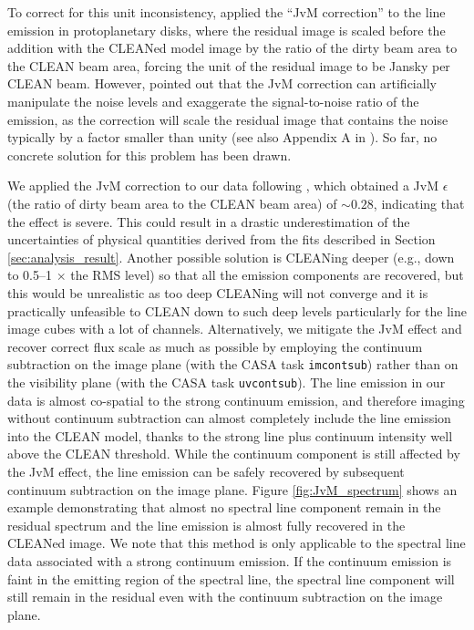 \documentclass[twocolumn, twocolappendix, astrosymb, times]{aastex631}
\begin{document}
To correct for this unit inconsistency, \citet{Czekala2021} applied the ``JvM correction'' to the line emission in protoplanetary disks, where the residual image is scaled before the addition with the CLEANed model image by the ratio of the dirty beam area to the CLEAN beam area, forcing the unit of the residual image to be Jansky per CLEAN beam. However, \citet{Casassus2022} pointed out that the JvM correction can artificially manipulate the noise levels and exaggerate the signal-to-noise ratio of the emission, as the correction will scale the residual image that contains the noise typically by a factor smaller than unity (see also Appendix A in \citealt{Casassus2023}). So far, no concrete solution for this problem has been drawn.

We applied the JvM correction to our data following \citet{Czekala2021}, which obtained a JvM $\epsilon$ (the ratio of dirty beam area to the CLEAN beam area) of $\sim0.28$, indicating that the effect is severe. This could result in a drastic underestimation of the uncertainties of physical quantities derived from the fits described in Section \ref{sec:analysis_result}. Another possible solution is CLEANing deeper (e.g., down to 0.5--1 $\times$ the RMS level) so that all the emission components are recovered, but this would be unrealistic as too deep CLEANing will not converge and it is practically unfeasible to CLEAN down to such deep levels particularly for the line image cubes with a lot of channels. Alternatively, we mitigate the JvM effect and recover correct flux scale as much as possible by employing the continuum subtraction on the image plane (with the CASA task \texttt{imcontsub}) rather than on the visibility plane (with the CASA task \texttt{uvcontsub}). The line emission in our data is almost co-spatial to the strong continuum emission, and therefore imaging without continuum subtraction can almost completely include the line emission into the CLEAN model, thanks to the strong line plus continuum intensity well above the CLEAN threshold. While the continuum component is still affected by the JvM effect, the line emission can be safely recovered by subsequent continuum subtraction on the image plane. Figure \ref{fig:JvM_spectrum} shows an example demonstrating that almost no spectral line component remain in the residual spectrum and the line emission is almost fully recovered in the CLEANed image. We note that this method is only applicable to the spectral line data associated with a strong continuum emission. If the continuum emission is faint in the emitting region of the spectral line, the spectral line component will still remain in the residual even with the continuum subtraction on the image plane. 
\end{document}
